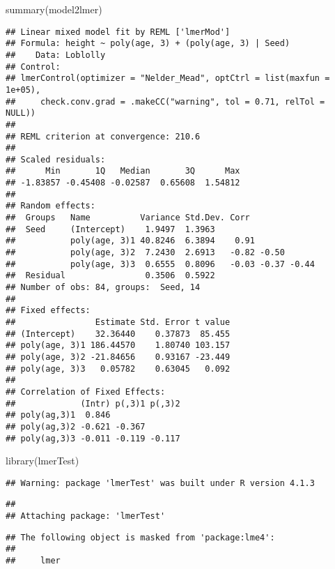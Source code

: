 \documentclass[
]{book}
\newenvironment{Shaded}{\begin{snugshade}}{\end{snugshade}}
\newcommand{\FunctionTok}[1]{\textcolor[rgb]{0.00,0.00,0.00}{#1}}
\newcommand{\NormalTok}[1]{#1}
\begin{document}
\begin{Shaded}
\begin{Highlighting}[]
\FunctionTok{summary}\NormalTok{(model2lmer)}
\end{Highlighting}
\end{Shaded}

\begin{verbatim}
## Linear mixed model fit by REML ['lmerMod']
## Formula: height ~ poly(age, 3) + (poly(age, 3) | Seed)
##    Data: Loblolly
## Control: 
## lmerControl(optimizer = "Nelder_Mead", optCtrl = list(maxfun = 1e+05),  
##     check.conv.grad = .makeCC("warning", tol = 0.71, relTol = NULL))
## 
## REML criterion at convergence: 210.6
## 
## Scaled residuals: 
##      Min       1Q   Median       3Q      Max 
## -1.83857 -0.45408 -0.02587  0.65608  1.54812 
## 
## Random effects:
##  Groups   Name          Variance Std.Dev. Corr             
##  Seed     (Intercept)    1.9497  1.3963                    
##           poly(age, 3)1 40.8246  6.3894    0.91            
##           poly(age, 3)2  7.2430  2.6913   -0.82 -0.50      
##           poly(age, 3)3  0.6555  0.8096   -0.03 -0.37 -0.44
##  Residual                0.3506  0.5922                    
## Number of obs: 84, groups:  Seed, 14
## 
## Fixed effects:
##                Estimate Std. Error t value
## (Intercept)    32.36440    0.37873  85.455
## poly(age, 3)1 186.44570    1.80740 103.157
## poly(age, 3)2 -21.84656    0.93167 -23.449
## poly(age, 3)3   0.05782    0.63045   0.092
## 
## Correlation of Fixed Effects:
##             (Intr) p(,3)1 p(,3)2
## poly(ag,3)1  0.846              
## poly(ag,3)2 -0.621 -0.367       
## poly(ag,3)3 -0.011 -0.119 -0.117
\end{verbatim}

\begin{Shaded}
\begin{Highlighting}[]
\FunctionTok{library}\NormalTok{(lmerTest)}
\end{Highlighting}
\end{Shaded}

\begin{verbatim}
## Warning: package 'lmerTest' was built under R version 4.1.3
\end{verbatim}

\begin{verbatim}
## 
## Attaching package: 'lmerTest'
\end{verbatim}

\begin{verbatim}
## The following object is masked from 'package:lme4':
## 
##     lmer
\end{verbatim}
\end{document}
